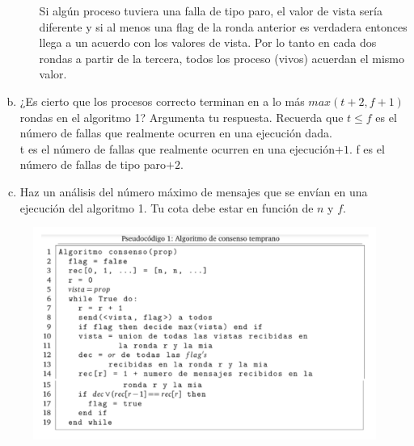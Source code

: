 \begin{enumerate}[a)]
\begin{itemize}
        Si algún proceso tuviera una falla de tipo paro, el valor de vista sería
        diferente y si al menos una flag de la ronda anterior es verdadera entonces
        llega a un acuerdo con los valores de vista. Por lo tanto en cada dos
        rondas a partir de la tercera, todos los proceso (vivos) acuerdan el mismo valor.
    \end{itemize}


    \item ¿Es cierto que los procesos correcto terminan en a lo más
    $max(t +2, f +1)$ rondas en el algoritmo 1? Argumenta tu respuesta.
    Recuerda que $t \leq f$ es el número de fallas que realmente ocurren en una
    ejecución dada.\\
    t es el número de fallas que realmente ocurren en una ejecución$+1$.
    f es el número de fallas de tipo paro$+2$.

    \item Haz un análisis del número máximo de mensajes que se envían en una
    ejecución del algoritmo 1. Tu cota debe estar en función de $n$ y $f$.
\end{enumerate}

\begin{figure}
    \includegraphics[width=\textwidth]{consensoTemprano.png}
\end{figure}

